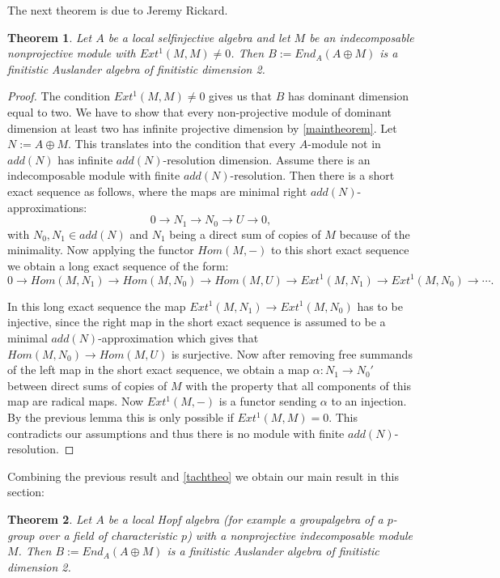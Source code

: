 \documentclass[a4paper]{amsart}
\newtheorem{theorem}{Theorem}[section]
\theoremstyle{definition}
\theoremstyle{remark}
\numberwithin{equation}{theorem}
\begin{document}
The next theorem is due to Jeremy Rickard.
\begin{theorem} \label{Ricktheo}
Let $A$ be a local selfinjective algebra and let $M$ be an indecomposable nonprojective module with $Ext^{1}(M,M) \neq 0$. Then $B:=End_A(A \oplus M)$ is a finitistic Auslander algebra of finitistic dimension 2.
\end{theorem}
\begin{proof}
The condition $Ext^{1}(M,M) \neq 0$ gives us that $B$ has dominant dimension equal to two.
We have to show that every non-projective module of dominant dimension at least two has infinite projective dimension by \ref{maintheorem}. Let $N:=A \oplus M$.
This translates into the condition that every $A$-module not in $add(N)$ has infinite $add(N)$-resolution dimension. Assume there is an indecomposable module with finite $add(N)$-resolution.
Then there is a short exact sequence as follows, where the maps are minimal right $add(N)$-approximations:
$$0 \rightarrow N_1 \rightarrow N_0 \rightarrow U \rightarrow 0,$$
with $N_0,N_1 \in add(N)$ and $N_1$ being a direct sum of copies of $M$ because of the minimality. Now applying the functor $Hom(M,-)$ to this short exact sequence we obtain a long exact sequence of the form:
$$0 \rightarrow Hom(M,N_1) \rightarrow Hom(M,N_0) \rightarrow Hom(M,U) \rightarrow Ext^1(M,N_1) \rightarrow Ext^1(M,N_0) \rightarrow \cdots .$$

In this long exact sequence the map $Ext^{1}(M,N_1) \rightarrow Ext^{1}(M,N_0)$ has to be injective, since the right map in the short exact sequence is assumed to be a minimal $add(N)$-approximation which gives that $Hom(M,N_0) \rightarrow Hom(M,U)$ is surjective.
Now after removing free summands of the left map in the short exact sequence, we obtain a map $\alpha: N_1 \rightarrow N_0'$ between direct sums of copies of $M$ with the property that all components of this map are radical maps. Now $Ext^{1}(M,-)$ is a functor sending $\alpha$ to an injection. By the previous lemma this is only possible if $Ext^{1}(M,M)=0$. This contradicts our assumptions and thus there is no module with finite $add(N)$-resolution.
\end{proof}
Combining the previous result and \ref{tachtheo} we obtain our main result in this section:
\begin{theorem}
Let $A$ be a local Hopf algebra (for example a groupalgebra of a $p$-group over a field of characteristic $p$) with a nonprojective indecomposable module $M$.
Then $B:=End_A(A \oplus M)$ is a finitistic Auslander algebra of finitistic dimension 2.
\end{theorem}
\end{document}
